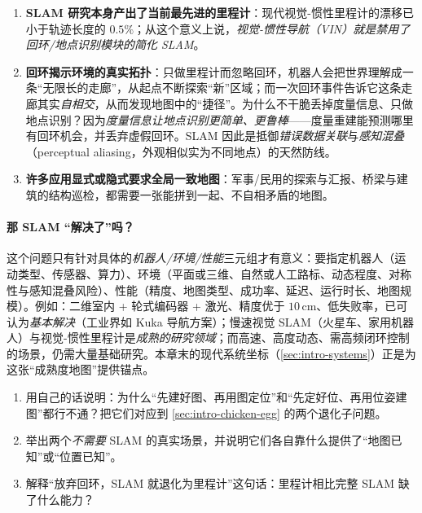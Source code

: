 \begin{enumerate}
  \item \textbf{SLAM 研究本身产出了当前最先进的里程计}：现代视觉-惯性里程计的漂移已小于轨迹长度的 $0.5\%$；从这个意义上说，\emph{视觉-惯性导航（VIN）就是禁用了回环/地点识别模块的简化 SLAM}\cite{cadena2016past}。
  \item \textbf{回环揭示环境的真实拓扑}：只做里程计而忽略回环，机器人会把世界理解成一条“无限长的走廊”，从起点不断探索“新”区域；而一次回环事件告诉它这条走廊其实\emph{自相交}，从而发现地图中的“捷径”。为什么不干脆丢掉度量信息、只做地点识别？因为\emph{度量信息让地点识别更简单、更鲁棒}——度量重建能预测哪里有回环机会，并丢弃虚假回环。SLAM 因此是抵御\emph{错误数据关联}与\emph{感知混叠}（perceptual aliasing，外观相似实为不同地点）的天然防线\cite{cadena2016past}。
  \item \textbf{许多应用显式或隐式要求全局一致地图}：军事/民用的探索与汇报、桥梁与建筑的结构巡检，都需要一张能拼到一起、不自相矛盾的地图\cite{cadena2016past}。
\end{enumerate}

\paragraph{那 SLAM “解决了”吗？}
这个问题只有针对具体的\emph{机器人/环境/性能}三元组才有意义\cite{cadena2016past}：要指定机器人（运动类型、传感器、算力）、环境（平面或三维、自然或人工路标、动态程度、对称性与感知混叠风险）、性能（精度、地图类型、成功率、延迟、运行时长、地图规模）。例如：二维室内 + 轮式编码器 + 激光、精度优于 $10\,$cm、低失败率，已可认为\emph{基本解决}（工业界如 Kuka 导航方案）；慢速视觉 SLAM（火星车、家用机器人）与视觉-惯性里程计是\emph{成熟的研究领域}；而高速、高度动态、需高频闭环控制的场景，仍需大量基础研究。本章末的现代系统坐标（\cref{sec:intro-systems}）正是为这张“成熟度地图”提供锚点。

\begin{practice}
\begin{enumerate}
  \item 用自己的话说明：为什么“先建好图、再用图定位”和“先定好位、再用位姿建图”都行不通？把它们对应到 \cref{sec:intro-chicken-egg} 的两个退化子问题。
  \item 举出两个\emph{不需要} SLAM 的真实场景，并说明它们各自靠什么提供了“地图已知”或“位置已知”。
  \item 解释“放弃回环，SLAM 就退化为里程计”这句话：里程计相比完整 SLAM 缺了什么能力？
\end{enumerate}
\end{practice}

